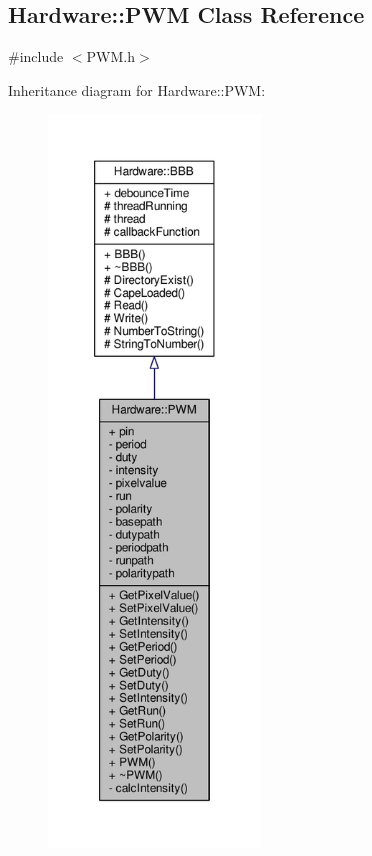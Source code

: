 \hypertarget{class_hardware_1_1_p_w_m}{}\subsection{Hardware\+:\+:P\+W\+M Class Reference}
\label{class_hardware_1_1_p_w_m}


{\ttfamily \#include $<$P\+W\+M.\+h$>$}



Inheritance diagram for Hardware\+:\+:P\+W\+M\+:
\nopagebreak
\begin{figure}[H]
\begin{center}
\leavevmode
\includegraphics[height=550pt]{class_hardware_1_1_p_w_m__inherit__graph}
\end{center}
\end{figure}


